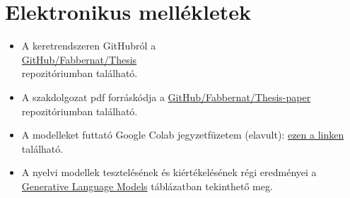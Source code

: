 \documentclass[12pt]{report}
\theoremstyle{definition}
\begin{document}
\chapter*{Elektronikus mellékletek}

\begin{itemize}
\item A keretrendszeren GitHubról a\\ \href{https://github.com/Fabbernat/Thesis}{GitHub/Fabbernat/Thesis}\\ repozitóriumban található.

\item A szakdolgozat pdf forráskódja a \href{https://github.com/Fabbernat/Thesis-paper}{GitHub/Fabbernat/Thesis-paper}\\ repozitóriumban található.

    \item
\label{att:colab}
A modelleket futtató Google Colab jegyzetfüzetem (elavult):
\href{https://colab.research.google.com/drive/1yA8IAd5z2oreKUXha-16Du2YrNhemNiU?usp=sharing}{ezen a linken}  található.

\item A nyelvi modellek tesztelésének és kiértékelésének régi eredményei a
\href{https://docs.google.com/spreadsheets/d/1y49lg52LHVFmTom-0ibCqYqWA1pKKhiUny-Pf3KVTIg/edit?usp=sharing}{Generative Language Models}
táblázatban tekinthető meg.
\end{itemize}
\end{document}
